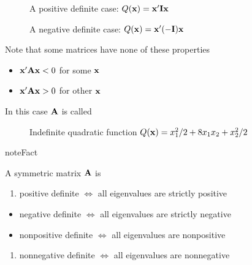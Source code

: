 \documentclass[letterpaper,10pt,english]{jupyterBook}
\begin{document}
\begin{figure}[htbp]
\centering
\capstart

\noindent{}
\caption{A positive definite case: \(Q({\bf x}) = {\bf x}' {\bf I} {\bf x}\)}\label{\detokenize{05.linear_algebra:f-qform-pd}}\end{figure}

\begin{figure}[htbp]
\centering
\capstart

\noindent{}
\caption{A negative definite case: \(Q({\bf x}) =
{\bf x}'(-{\bf I}){\bf x}\)}\label{\detokenize{05.linear_algebra:f-qform-nd}}\end{figure}

\sphinxAtStartPar
Note that some matrices have none of these properties
\begin{itemize}
\item {} 
\sphinxAtStartPar
\({\bf x}' {\bf A} {\bf x} < 0\) for some \({\bf x}\)

\item {} 
\sphinxAtStartPar
\({\bf x}' {\bf A} {\bf x} > 0\) for other \({\bf x}\)

\end{itemize}

\sphinxAtStartPar
In this case \({\bf A}\) is called 

\begin{figure}[htbp]
\centering
\capstart

\noindent{}
\caption{Indefinite quadratic function \(Q({\bf x}) = x_1^2/2 +
8 x_1 x_2 + x_2^2/2\)}\label{\detokenize{05.linear_algebra:f-qform-indef}}\end{figure}

\begin{sphinxadmonition}{note}{Fact}

\sphinxAtStartPar
A symmetric matrix \({\bf A}\) is
\begin{enumerate}
%
\item {} 
\sphinxAtStartPar
positive definite \(\iff\) all eigenvalues are strictly positive

\end{enumerate}
\begin{itemize}
\item {} 
\sphinxAtStartPar
negative definite \(\iff\) all eigenvalues are strictly negative

\item {} 
\sphinxAtStartPar
nonpositive definite \(\iff\) all eigenvalues are nonpositive

\end{itemize}
\begin{enumerate}
%
\setcounter{enumi}{8}
\item {} 
\sphinxAtStartPar
nonnegative definite \(\iff\) all eigenvalues are nonnegative

\end{enumerate}
\end{sphinxadmonition}
\end{document}
